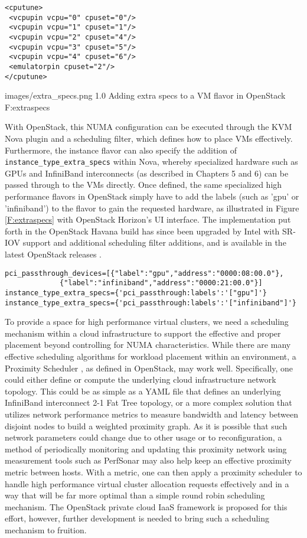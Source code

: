 \begin{verbatim}
<cputune>
 <vcpupin vcpu="0" cpuset="0"/>
 <vcpupin vcpu="1" cpuset="1"/>
 <vcpupin vcpu="2" cpuset="4"/>
 <vcpupin vcpu="3" cpuset="5"/>
 <vcpupin vcpu="4" cpuset="6"/>
 <emulatorpin cpuset="2"/>
</cputune>
\end{verbatim}

  {images/extra_specs.png}
  {1.0}
  {Adding extra specs to a VM flavor in OpenStack}
  {F:extraspecs}

With OpenStack, this NUMA configuration can be executed through the KVM Nova plugin and a scheduling filter, which defines how to place VMs effectively. Furthermore, the instance flavor can also specify the addition of \verb!instance_type_extra_specs! within Nova, whereby specialized hardware such as GPUs and InfiniBand interconnects (as described in Chapters 5 and 6) can be passed through to the VMs directly. Once defined, the same specialized high performance flavors in OpenStack simply have to add the labels (such as 'gpu' or 'infiniband') to the flavor to gain the requested hardware, as illustrated in Figure \ref{F:extraspecs} with OpenStack Horizon's UI interface.  The implementation put forth in the OpenStack Havana build has since been upgraded by Intel with SR-IOV support and additional scheduling filter additions, and is available in the latest OpenStack releases \cite{jiang2015}. 

\begin{verbatim}
pci_passthrough_devices=[{"label":"gpu","address":"0000:08:00.0"},
			 {"label":"infiniband","address":"0000:21:00.0"}]
instance_type_extra_specs={'pci_passthrough:labels':'["gpu"]'}
instance_type_extra_specs={'pci_passthrough:labels':'["infiniband"]'}
\end{verbatim}
 

To provide a space for high performance virtual clusters, we need a scheduling mechanism within a cloud infrastructure to support the effective and proper placement beyond controlling for NUMA characteristics. While there are many effective scheduling algorithms for workload placement within an environment, a Proximity Scheduler \cite{www-proximity-scheduler}, as defined in OpenStack, may work well. Specifically, one could either define or compute the underlying cloud infrastructure network topology. This could be as simple as a YAML file that defines an underlying InfiniBand interconnect 2-1 Fat Tree topology, or a more complex solution that utilizes network performance metrics to measure bandwidth and latency between disjoint nodes to build a weighted proximity graph. As it is possible that such network parameters could change due to other usage or to reconfiguration, a method of periodically monitoring and updating this proximity network using measurement tools such as PerfSonar \cite{hanemann2005perfsonar} may also help keep an effective proximity metric between hosts. With a metric, one can then apply a proximity scheduler to handle high performance virtual cluster allocation requests effectively and in a way that will be far more optimal than a simple round robin scheduling mechanism. The OpenStack private cloud IaaS framework is proposed for this effort, however, further development is needed to bring such a scheduling mechanism to fruition.  

